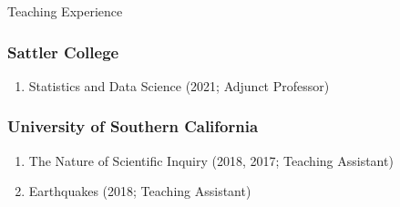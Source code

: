 \begin{rSection}{Teaching Experience}
	\subsubsection*{Sattler College}
		\begin{enumerate}
			\item Statistics and Data Science (2021; Adjunct Professor)
		\end{enumerate}
	\subsubsection*{University of Southern California}
		\begin{enumerate}
			\item The Nature of Scientific Inquiry (2018, 2017; Teaching Assistant)
			\item Earthquakes (2018; Teaching Assistant)
		\end{enumerate}
\end{rSection}
